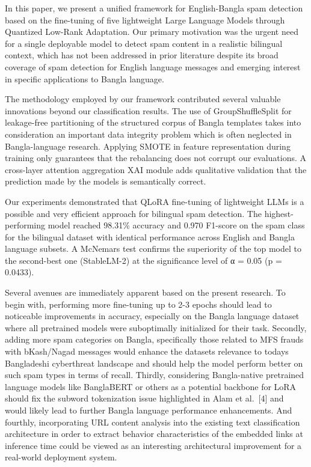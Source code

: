 In this paper, we present a unified framework for English-Bangla spam
detection based on the fine-tuning of five lightweight Large Language
Models through Quantized Low-Rank Adaptation. Our primary motivation was
the urgent need for a single deployable model to detect spam content in
a realistic bilingual context, which has not been addressed in prior
literature despite its broad coverage of spam detection for English
language messages and emerging interest in specific applications to
Bangla language.

The methodology employed by our framework contributed several valuable
innovations beyond our classification results. The use of
GroupShuffleSplit for leakage-free partitioning of the structured corpus
of Bangla templates takes into consideration an important data integrity
problem which is often neglected in Bangla-language research. Applying
SMOTE in feature representation during training only guarantees that the
rebalancing does not corrupt our evaluations. A cross-layer attention
aggregation XAI module adds qualitative validation that the prediction
made by the models is semantically correct.

Our experiments demonstrated that QLoRA fine-tuning of lightweight LLMs
is a possible and very efficient approach for bilingual spam detection.
The highest-performing model reached 98.31\% accuracy and 0.970 F1-score
on the spam class for the bilingual dataset with identical performance
across English and Bangla language subsets. A McNemar\textquotesingle s
test confirms the superiority of the top model to the second-best one
(StableLM-2) at the significance level of α = 0.05 (p = 0.0433).

Several avenues are immediately apparent based on the present research.
To begin with, performing more fine-tuning up to 2-3 epochs should lead
to noticeable improvements in accuracy, especially on the Bangla
language dataset where all pretrained models were suboptimally
initialized for their task. Secondly, adding more spam categories on
Bangla, specifically those related to MFS frauds with bKash/Nagad
messages would enhance the dataset\textquotesingle s relevance to
today\textquotesingle s Bangladeshi cyberthreat landscape and should
help the model perform better on such spam types in terms of recall.
Thirdly, considering Bangla-native pretrained language models like
BanglaBERT or others as a potential backbone for LoRA should fix the
subword tokenization issue highlighted in Alam et al.~{[}4{]} and would
likely lead to further Bangla language performance enhancements. And
fourthly, incorporating URL content analysis into the existing text
classification architecture in order to extract behavior characteristics
of the embedded links at inference time could be viewed as an
interesting architectural improvement for a real-world deployment
system.

